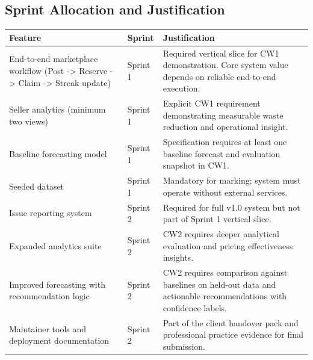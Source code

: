 \documentclass[11pt, a4paper]{report}
\begin{document}
	\FloatBarrier
	
	\clearpage
	
	\subsection{Sprint Allocation and Justification}
	
	\renewcommand{\arraystretch}{1.3}
	
	\begin{table}[H]
		\centering
		\begin{tabular}{|p{4cm}|p{2cm}|p{8cm}|}
			\hline
			\textbf{Feature} & \textbf{Sprint} & \textbf{Justification} \\
			\hline
			
			End-to-end marketplace workflow (Post -> Reserve -> Claim -> Streak update) &
			Sprint 1 &
			Required vertical slice for CW1 demonstration. Core system value depends on reliable end-to-end execution. \\
			\hline
			
			Seller analytics (minimum two views) &
			Sprint 1 &
			Explicit CW1 requirement demonstrating measurable waste reduction and operational insight. \\
			\hline
			
			Baseline forecasting model &
			Sprint 1 &
			Specification requires at least one baseline forecast and evaluation snapshot in CW1. \\
			\hline
			
			Seeded dataset &
			Sprint 1 &
			Mandatory for marking; system must operate without external services. \\
			\hline
			
			Issue reporting system &
			Sprint 2 &
			Required for full v1.0 system but not part of Sprint 1 vertical slice. \\
			\hline
			
			Expanded analytics suite &
			Sprint 2 &
			CW2 requires deeper analytical evaluation and pricing effectiveness insights. \\
			\hline
			
			Improved forecasting with recommendation logic &
			Sprint 2 &
			CW2 requires comparison against baselines on held-out data and actionable recommendations with confidence labels. \\
			\hline
			
			Maintainer tools and deployment documentation &
			Sprint 2 &
			Part of the client handover pack and professional practice evidence for final submission. \\
			\hline
			

\end{tabular}
\end{table}
\end{document}

